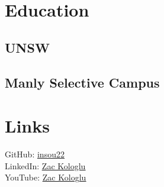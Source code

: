 \documentclass[a4paper]{deedy-resume}
\begin{document}

\lastupdated %



\begin{minipage}[t]{0.33\textwidth}


\section{Education} 

\subsection{UNSW}


\sectionspace


\subsection{Manly Selective Campus}


\sectionspace


\section{Links} 

GitHub:   \href{https://github.com/insou22}
               {\underline{insou22}} \\
LinkedIn: \href{https://www.linkedin.com/in/zac-kologlu-3184a0114/}
               {\underline{Zac Kologlu}} \\
YouTube:  \href{https://www.youtube.com/channel/UC_lXC61mYV65mXKbHo23owg/}
               {\underline{Zac Kologlu}} \\


\end{minipage}
\end{document}
